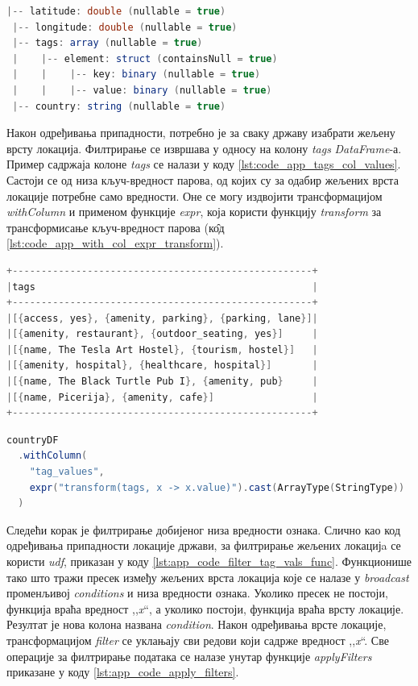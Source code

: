 \documentclass[12pt,oneside]{memoir}
\begin{document}
\begin{lstlisting}[caption={Шема \textit{DataFrame}-а након додељивања држава локацијама}, language=Scala, label={lst:app_code_countrydf_schema}]
 |-- latitude: double (nullable = true)
 |-- longitude: double (nullable = true)
 |-- tags: array (nullable = true)
 |    |-- element: struct (containsNull = true)
 |    |    |-- key: binary (nullable = true)
 |    |    |-- value: binary (nullable = true)
 |-- country: string (nullable = true)
\end{lstlisting}

Након одређивања припадности, потребно је за сваку државу изабрати жељену врсту локација. Филтрирање се извршава у односу на колону \textit{tags} \textit{DataFrame}-а. Пример садржаја колоне \textit{tags} се налази у коду \ref{lst:code_app_tags_col_values}. Састоји се од низа кључ-вредност парова, од којих су за одабир жељених врста локације потребне само вредности. Оне се могу издвојити трансформацијом \textit{withColumn} и применом функције \textit{expr}, која користи функцију \textit{transform} за трансформисање кључ-вредност парова (к\^{о}д \ref{lst:code_app_with_col_expr_transform}).

\begin{lstlisting}[caption={Пример вредности колоне \textit{tags}}, language=Scala, label={lst:code_app_tags_col_values}]
+----------------------------------------------------+
|tags                                                |
+----------------------------------------------------+
|[{access, yes}, {amenity, parking}, {parking, lane}]|
|[{amenity, restaurant}, {outdoor_seating, yes}]     |
|[{name, The Tesla Art Hostel}, {tourism, hostel}]   |
|[{amenity, hospital}, {healthcare, hospital}]       |
|[{name, The Black Turtle Pub I}, {amenity, pub}     |
|[{name, Picerija}, {amenity, cafe}]                 |
+----------------------------------------------------+
\end{lstlisting}

\begin{lstlisting}[caption={Конструкција низа вредности колоне \textit{tags}}, language=Scala, label={lst:code_app_with_col_expr_transform}]
countryDF
  .withColumn(
    "tag_values",
    expr("transform(tags, x -> x.value)").cast(ArrayType(StringType))
  )
\end{lstlisting}

Следећи корак је филтрирање добијеног низа вредности ознака. Слично као код одређивања припадности локације држави, за филтрирање жељених локацијa се користи \textit{udf}, приказан у коду \ref{lst:app_code_filter_tag_vals_func}. Функционише тако што тражи пресек између жељених врста локација које се налазе у \textit{broadcast} променљивој \textit{conditions} и низа вредности ознака. Уколико пресек не постоји, функција враћа вредност ,,\textit{x}``, а уколико постоји, функција враћа врсту локације. Резултат је нова колона названа \textit{condition}. Након одређивања врсте локације, трансформацијом \textit{filter} се уклањају сви редови који садрже вредност ,,\textit{x}``. Све операције за филтрирање података се налазе унутар функције \textit{applyFilters} приказане у коду \ref{lst:app_code_apply_filters}.
\end{document}
